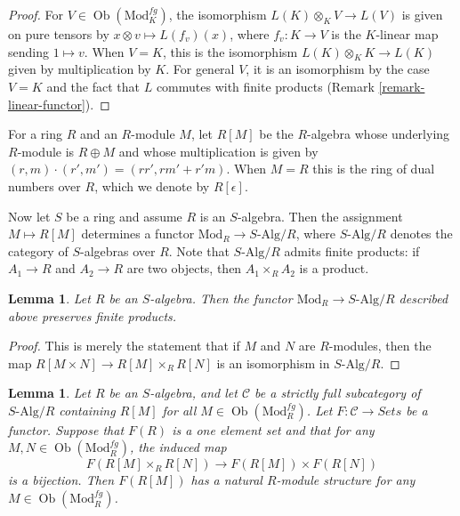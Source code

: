 \documentclass{stacks-project}
\theoremstyle{plain}
\newtheorem{lemma}[subsection]{Lemma}
\theoremstyle{definition}
\theoremstyle{remark}
\numberwithin{equation}{subsection}
\def\Ob{\mathop{\mathrm{Ob}}\nolimits}
\begin{document}
\begin{proof}
For $V \in \Ob(\text{Mod}^{fg}_K)$, the isomorphism
$L(K) \otimes_K V \to L(V)$ is given on pure tensors by
$x \otimes v \mapsto L(f_v)(x)$, where $f_v: K \to V$ is the $K$-linear map
sending $1 \mapsto v$.  When $V = K$, this is the isomorphism
$L(K) \otimes_K K \to L(K)$ given by multiplication by $K$.
For general $V$, it is an isomorphism by the case $V = K$ and the
fact that $L$ commutes with finite
products (Remark \ref{remark-linear-functor}).
\end{proof}

\noindent
For a ring $R$ and an $R$-module $M$, let $R[M]$ be the $R$-algebra whose
underlying $R$-module is $R \oplus M$ and whose multiplication is given by
$(r, m) \cdot (r', m') = (rr', rm' + r'm)$.  When $M = R$ this is the ring of
dual numbers over $R$, which we denote by $R[\epsilon]$.

\medskip\noindent
Now let $S$ be a ring and assume $R$ is an $S$-algebra.
Then the assignment $M \mapsto R[M]$ determines a functor
$\text{Mod}_R \to S\text{-Alg}/R$, where $S\text{-Alg}/R$
denotes the category of $S$-algebras over $R$. Note that
$S\text{-Alg}/R$ admits finite products: if $A_1 \to R$ and
$A_2 \to R$ are two objects, then $A_1 \times_R A_2$ is a product.

\begin{lemma}
\label{lemma-preserves-products}
Let $R$ be an $S$-algebra. Then the functor
$\text{Mod}_R \to S\text{-Alg}/R$ described above preserves finite products.
\end{lemma}

\begin{proof}
This is merely the statement that if $M$ and $N$ are $R$-modules, then the map
$R[M \times N] \to R[M] \times_R R[N]$ is an isomorphism in
$S\text{-Alg}/R$.
\end{proof}

\begin{lemma}
\label{lemma-tangent-space-functor}
Let $R$ be an $S$-algebra, and let $\mathcal{C}$ be a strictly full
subcategory of $S\text{-Alg}/R$ containing $R[M]$ for all
$M \in \Ob(\text{Mod}^{fg}_R)$.
Let $F: \mathcal{C} \to \textit{Sets}$ be a functor. Suppose that
$F(R)$ is a one element set and that for any $M, N \in
\Ob(\text{Mod}^{fg}_R)$, the induced map
$$
F(R[M] \times_R R[N]) \to F(R[M]) \times F(R[N])
$$
is a bijection. Then $F(R[M])$ has a natural $R$-module structure for any $M
\in \Ob(\text{Mod}^{fg}_R)$.
\end{lemma}
\end{document}
